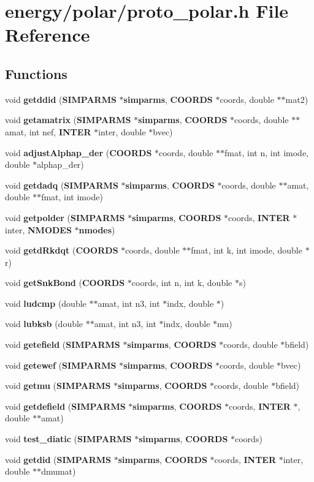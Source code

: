 \section{energy/polar/proto\_\-polar.h File Reference}
\label{energy_2polar_2proto__polar_8h}
\subsection*{Functions}
\begin{CompactItemize}
\item 
void {\bf getddid} ({\bf SIMPARMS} $\ast${\bf simparms}, {\bf COORDS} $\ast$coords, double $\ast$$\ast$mat2)
\item 
void {\bf getamatrix} ({\bf SIMPARMS} $\ast${\bf simparms}, {\bf COORDS} $\ast$coords, double $\ast$$\ast$amat, int nef, {\bf INTER} $\ast$inter, double $\ast$bvec)
\item 
void {\bf adjust\-Alphap\_\-der} ({\bf COORDS} $\ast$coords, double $\ast$$\ast$fmat, int n, int imode, double $\ast$alphap\_\-der)
\item 
void {\bf getdadq} ({\bf SIMPARMS} $\ast${\bf simparms}, {\bf COORDS} $\ast$coords, double $\ast$$\ast$amat, double $\ast$$\ast$fmat, int imode)
\item 
void {\bf getpolder} ({\bf SIMPARMS} $\ast${\bf simparms}, {\bf COORDS} $\ast$coords, {\bf INTER} $\ast$inter, {\bf NMODES} $\ast${\bf nmodes})
\item 
void {\bf getd\-Rkdqt} ({\bf COORDS} $\ast$coords, double $\ast$$\ast$fmat, int k, int imode, double $\ast$r)
\item 
void {\bf get\-Snk\-Bond} ({\bf COORDS} $\ast$coords, int n, int k, double $\ast$s)
\item 
void {\bf ludcmp} (double $\ast$$\ast$amat, int n3, int $\ast$indx, double $\ast$)
\item 
void {\bf lubksb} (double $\ast$$\ast$amat, int n3, int $\ast$indx, double $\ast$mu)
\item 
void {\bf getefield} ({\bf SIMPARMS} $\ast${\bf simparms}, {\bf COORDS} $\ast$coords, double $\ast$bfield)
\item 
void {\bf getewef} ({\bf SIMPARMS} $\ast${\bf simparms}, {\bf COORDS} $\ast$coords, double $\ast$bvec)
\item 
void {\bf getmu} ({\bf SIMPARMS} $\ast${\bf simparms}, {\bf COORDS} $\ast$coords, double $\ast$bfield)
\item 
void {\bf getdefield} ({\bf SIMPARMS} $\ast${\bf simparms}, {\bf COORDS} $\ast$coords, {\bf INTER} $\ast$, double $\ast$$\ast$amat)
\item 
void {\bf test\_\-diatic} ({\bf SIMPARMS} $\ast${\bf simparms}, {\bf COORDS} $\ast$coords)
\item 
void {\bf getdid} ({\bf SIMPARMS} $\ast${\bf simparms}, {\bf COORDS} $\ast$coords, {\bf INTER} $\ast$inter, double $\ast$$\ast$dmumat)
\end{CompactItemize}


